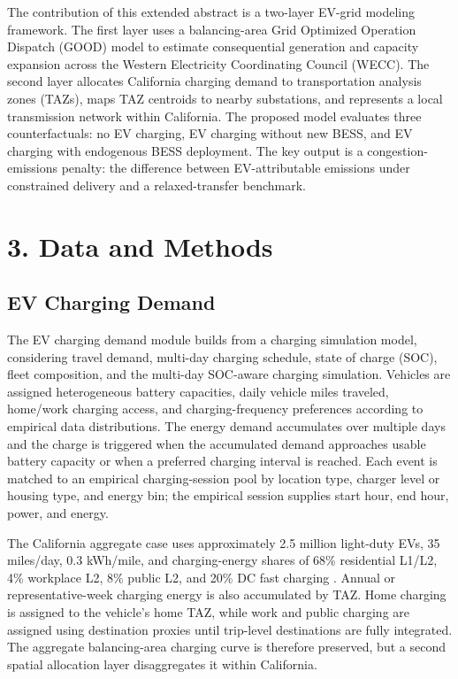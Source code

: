 \documentclass[11pt]{article}
\begin{document}
The contribution of this extended abstract is a two-layer EV-grid modeling framework. The first layer uses a balancing-area Grid Optimized Operation Dispatch (GOOD) model to estimate consequential generation and capacity expansion across the Western Electricity Coordinating Council (WECC). The second layer allocates California charging demand to transportation analysis zones (TAZs), maps TAZ centroids to nearby substations, and represents a local transmission network within California. The proposed model evaluates three counterfactuals: no EV charging, EV charging without new BESS, and EV charging with endogenous BESS deployment. The key output is a congestion-emissions penalty: the difference between EV-attributable emissions under constrained delivery and a relaxed-transfer benchmark.

\section*{3. Data and Methods}

\subsection*{EV Charging Demand}

The EV charging demand module builds from a charging simulation model, considering travel demand, multi-day charging schedule, state of charge (SOC), fleet composition, and 
the multi-day SOC-aware charging simulation. Vehicles are assigned heterogeneous battery capacities, daily vehicle miles traveled, home/work charging access, and charging-frequency preferences according to empirical data distributions. The energy demand accumulates over multiple days and the charge is triggered when the accumulated demand approaches usable battery capacity or when a preferred charging interval is reached. Each event is matched to an empirical charging-session pool by location type, charger level or housing type, and energy bin; the empirical session supplies start hour, end hour, power, and energy.

The California aggregate case uses approximately 2.5 million light-duty EVs, 35 miles/day, 0.3 kWh/mile, and charging-energy shares of 68\% residential L1/L2, 4\% workplace L2, 8\% public L2, and 20\% DC fast charging \cite{nrel_2030charging}. Annual or representative-week charging energy is also accumulated by TAZ. Home charging is assigned to the vehicle's home TAZ, while work and public charging are assigned using destination proxies until trip-level destinations are fully integrated. The aggregate balancing-area charging curve is therefore preserved, but a second spatial allocation layer disaggregates it within California.
\end{document}
